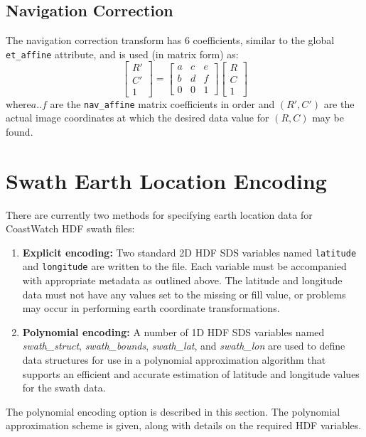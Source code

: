 \subsection{Navigation Correction}

The navigation correction transform has 6 coefficients, similar to
the global {\tt et\_affine} attribute, and is used (in matrix form)
as:
\[
  \left[ \begin{array}{c}
           R' \\
           C' \\
           1
         \end{array}  
  \right]
  = 
  \left[ \begin{array}{ccc}
           a & c & e \\
           b & d & f \\
           0 & 0 & 1
         \end{array}
  \right]
  \left[ \begin{array}{c}
           R \\
           C \\
           1
         \end{array}
  \right]
\]
where$a..f$ are the {\tt nav\_affine} matrix coefficients in order and
$(R',C')$ are the actual image coordinates at which the desired data
value for $(R,C)$ may be found.

\section{Swath Earth Location Encoding}
\label{swath}

There are currently two methods for specifying earth location data for
CoastWatch HDF swath files: 
\begin{enumerate}

  \item \textbf{Explicit encoding:} Two standard 2D HDF SDS variables
  named {\tt latitude} and {\tt longitude} are written to the
  file. Each variable must be accompanied with appropriate metadata as
  outlined above. The latitude and longitude data must not have any
  values set to the missing or fill value, or problems may occur in
  performing earth coordinate transformations.

  \item \textbf{Polynomial encoding:} A number of 1D HDF SDS variables
  named {\em swath\_struct}, {\em swath\_bounds}, {\em swath\_lat},
  and {\em swath\_lon} are used to define data structures for use in a
  polynomial approximation algorithm that supports an efficient and
  accurate estimation of latitude and longitude values for the swath
  data.

\end{enumerate}
The polynomial encoding option is described in this section. The
polynomial approximation scheme is given, along with details on the
required HDF variables.

